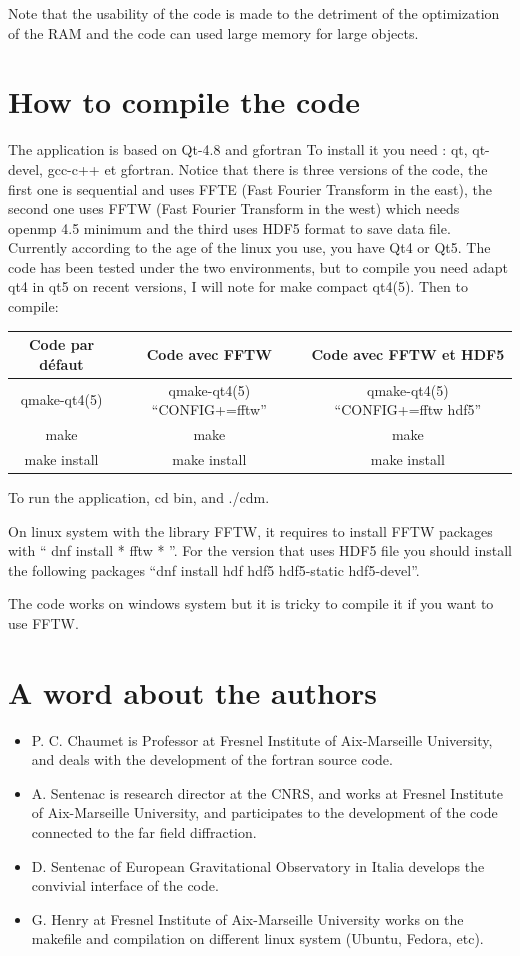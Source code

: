 Note that the usability of the code is made to the detriment of the
optimization of the RAM and the code can used large memory for large
objects.


\section{How to compile the code}
The application is based on Qt-4.8 and gfortran To install it you need
: qt, qt-devel, gcc-c++ et gfortran.  Notice that there is three
versions of the code, the first one is sequential and uses FFTE (Fast
Fourier Transform in the east), the second one uses FFTW (Fast Fourier
Transform in the west) which needs openmp 4.5 minimum and the third
uses HDF5 format to save data file.  Currently according to the age of
the linux you use, you have Qt4 or Qt5. The code has been tested under
the two environments, but to compile you need adapt qt4 in qt5 on
recent versions, I will note for make compact qt4(5). Then to compile:

\begin{tabular}{|c|c|c|}
  \hline
  Code par défaut & Code avec FFTW & Code avec FFTW et HDF5 \\
  \hline
  qmake-qt4(5) & qmake-qt4(5) ``CONFIG+=fftw'' & qmake-qt4(5) ``CONFIG+=fftw hdf5'' \\
  make & make & make \\
make install & make install & make install \\
  \hline
\end{tabular}

To run the application, cd bin, and ./cdm.


On linux system with the library FFTW, it requires to install FFTW
packages with `` dnf install * fftw * ''. For the version that uses
HDF5 file you should install the following packages ``dnf install hdf
hdf5 hdf5-static hdf5-devel''.

The code works on windows system but it is tricky to compile it if you
want to use FFTW.

\section{A word about the authors}

\begin{itemize}
\item P. C. Chaumet is Professor at Fresnel Institute of Aix-Marseille
  University, and deals with the development of the fortran source
  code.
\item A. Sentenac is research director at the CNRS, and works at
  Fresnel Institute of Aix-Marseille University, and participates to
  the development of the code connected to the far field diffraction.
\item D. Sentenac of European Gravitational Observatory in Italia
  develops the convivial interface of the code.
\item G. Henry at Fresnel Institute of Aix-Marseille University works
  on the makefile and compilation on different linux system (Ubuntu,
  Fedora, etc).
\end{itemize}

